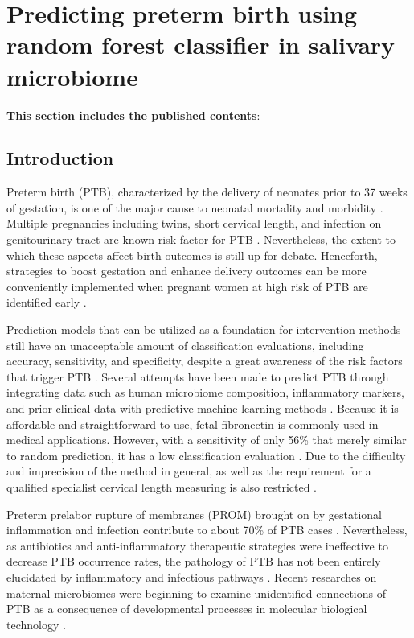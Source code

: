 \documentclass[11pt, a4paper, onecolumn, oneside]{report}
\begin{document}
    \section{Predicting preterm birth using random forest classifier in salivary microbiome}
        \label{section:PTB}

        \textbf{This section includes the published contents}: \\
         \nocite{PTB-JW-1}

        \subsection{Introduction}
            Preterm birth (PTB), characterized by the delivery of neonates prior to 37 weeks of gestation, is one of the major cause to neonatal mortality and morbidity \cite{PTB-rate-1}. Multiple pregnancies including twins, short cervical length, and infection on genitourinary tract are known risk factor for PTB \cite{PTB-cause-1}. Nevertheless, the extent to which these aspects affect birth outcomes is still up for debate. Henceforth, strategies to boost gestation and enhance delivery outcomes can be more conveniently implemented when pregnant women at high risk of PTB are identified early \cite{PTB-care-1}.

            Prediction models that can be utilized as a foundation for intervention methods still have an unacceptable amount of classification evaluations, including accuracy, sensitivity, and specificity, despite a great awareness of the risk factors that trigger PTB \cite{PTB-prediction-1}. Several attempts have been made to predict PTB through integrating data such as human microbiome composition, inflammatory markers, and prior clinical data with predictive machine learning methods \cite{PTB-prediction-2}. Because it is affordable and straightforward to use, fetal fibronectin is commonly used in medical applications. However, with a sensitivity of only 56\% that merely similar to random prediction, it has a low classification evaluation \cite{PTB-prediction-3}. Due to the difficulty and imprecision of the method in general, as well as the requirement for a qualified specialist cervical length measuring is also restricted \cite{PTB-prediction-4}.

            Preterm prelabor rupture of membranes (PROM) brought on by gestational inflammation and infection contribute to about 70\% of PTB cases \cite{PTB-prediction-5}. Nevertheless, as antibiotics and anti-inflammatory therapeutic strategies were ineffective to decrease PTB occurrence rates, the pathology of PTB has not been entirely elucidated by inflammatory and infectious pathways \cite{PTB-mechanism-1}. Recent researches on maternal microbiomes were beginning to examine unidentified connections of PTB as a consequence of developmental processes in molecular biological technology \cite{PTB-mechanism-2}.
\end{document}
